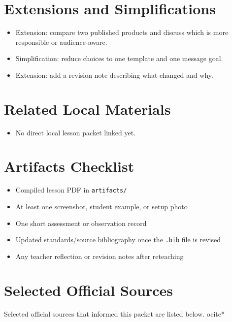 \documentclass[11pt]{article}
\begin{document}
\section*{Extensions and Simplifications}
\begin{itemize}[leftmargin=*]
\item Extension: compare two published products and discuss which is more responsible or audience-aware.
\item Simplification: reduce choices to one template and one message goal.
\item Extension: add a revision note describing what changed and why.
\end{itemize}

\section*{Related Local Materials}
\begin{itemize}[leftmargin=*]
\item No direct local lesson packet linked yet.
\end{itemize}

\section*{Artifacts Checklist}
\begin{itemize}[leftmargin=*]
\item Compiled lesson PDF in \texttt{artifacts/}
\item At least one screenshot, student example, or setup photo
\item One short assessment or observation record
\item Updated standards/source bibliography once the \texttt{.bib} file is revised
\item Any teacher reflection or revision notes after reteaching
\end{itemize}

\section*{Selected Official Sources}
Selected official sources that informed this packet are listed below.
ocite{*}



\end{document}
